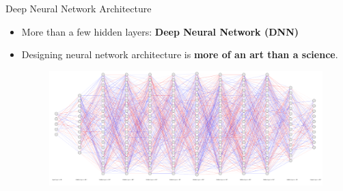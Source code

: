 \documentclass[serif, aspectratio=169]{beamer}
\begin{document}
\begin{frame}[t]{Deep Neural Network Architecture}
\begin{itemize}
    \item More than a few hidden layers: \textbf{Deep Neural Network (DNN)}
    \item Designing neural network architecture is \textbf{more of an art than a science}.
        \begin{figure}[bh]
            \includegraphics[keepaspectratio, scale=0.3]{pic/3/huge-nn.png}
        \end{figure}
\end{itemize}
\end{frame}
\end{document}
